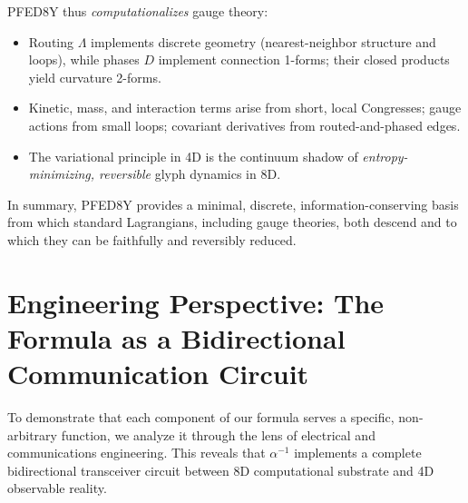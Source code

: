 \documentclass[pdflatex,sn-mathphys-num]{sn-jnl}
\theoremstyle{thmstyleone}
\theoremstyle{thmstyletwo}
\theoremstyle{thmstylethree}
\begin{document}
PFED8Y thus \emph{computationalizes} gauge theory:
\begin{itemize}
    \item Routing $\Lambda$ implements discrete geometry (nearest-neighbor structure and loops), while phases $D$ implement connection 1-forms; their closed products yield curvature 2-forms.
    
    \item Kinetic, mass, and interaction terms arise from short, local Congresses; gauge actions from small loops; covariant derivatives from routed-and-phased edges.
    
    \item The variational principle in 4D is the continuum shadow of \emph{entropy-minimizing, reversible} glyph dynamics in 8D.
\end{itemize}

In summary, PFED8Y provides a minimal, discrete, information-conserving basis from which standard Lagrangians, including gauge theories, both descend and to which they can be faithfully and reversibly reduced.


\section{Engineering Perspective: The Formula as a Bidirectional Communication Circuit}\label{sec:s1-engineering}
To demonstrate that each component of our formula serves a specific, non-arbitrary function, we analyze it through the lens of electrical and communications engineering. This reveals that $\alpha^{-1}$ implements a complete bidirectional transceiver circuit between 8D computational substrate and 4D observable reality.
\end{document}
